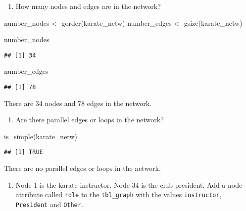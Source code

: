 \documentclass[
]{article}
\newenvironment{Shaded}{\begin{snugshade}}{\end{snugshade}}
\newcommand{\FunctionTok}[1]{\textcolor[rgb]{0.00,0.00,0.00}{#1}}
\newcommand{\NormalTok}[1]{#1}
\newcommand{\OtherTok}[1]{\textcolor[rgb]{0.56,0.35,0.01}{#1}}
\providecommand{\tightlist}{%
  \setlength{\itemsep}{0pt}\setlength{\parskip}{0pt}}
\begin{document}
\begin{enumerate}
\def\labelenumi{(\arabic{enumi})}
\setcounter{enumi}{1}
\tightlist
\item
  How many nodes and edges are in the network?
\end{enumerate}

\begin{Shaded}
\begin{Highlighting}[]
\NormalTok{number\_nodes }\OtherTok{\textless{}{-}} \FunctionTok{gorder}\NormalTok{(karate\_netw)}
\NormalTok{number\_edges }\OtherTok{\textless{}{-}} \FunctionTok{gsize}\NormalTok{(karate\_netw)}

\NormalTok{number\_nodes}
\end{Highlighting}
\end{Shaded}

\begin{verbatim}
## [1] 34
\end{verbatim}

\begin{Shaded}
\begin{Highlighting}[]
\NormalTok{number\_edges}
\end{Highlighting}
\end{Shaded}

\begin{verbatim}
## [1] 78
\end{verbatim}

\Ans There are 34 nodes and 78 edges in the network.

\begin{enumerate}
\def\labelenumi{(\arabic{enumi})}
\setcounter{enumi}{2}
\tightlist
\item
  Are there parallel edges or loops in the network?
\end{enumerate}

\begin{Shaded}
\begin{Highlighting}[]
\FunctionTok{is\_simple}\NormalTok{(karate\_netw)}
\end{Highlighting}
\end{Shaded}

\begin{verbatim}
## [1] TRUE
\end{verbatim}

\Ans There are no parallel edges or loops in the network.

\begin{enumerate}
\def\labelenumi{(\arabic{enumi})}
\setcounter{enumi}{3}
\tightlist
\item
  Node 1 is the karate instructor. Node 34 is the club president. Add a
  node attribute called \texttt{role} to the \texttt{tbl\_graph} with
  the values \texttt{Instructor}, \texttt{President} and \texttt{Other}.
\end{enumerate}
\end{document}
